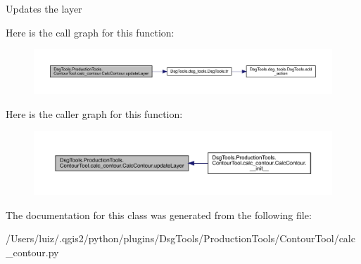 \begin{DoxyVerb}Updates the layer
\end{DoxyVerb}
 Here is the call graph for this function\+:
\nopagebreak
\begin{figure}[H]
\begin{center}
\leavevmode
\includegraphics[width=350pt]{class_dsg_tools_1_1_production_tools_1_1_contour_tool_1_1calc__contour_1_1_calc_contour_a909c2b0fc4a807a06532ddfbc44c8199_cgraph}
\end{center}
\end{figure}
Here is the caller graph for this function\+:
\nopagebreak
\begin{figure}[H]
\begin{center}
\leavevmode
\includegraphics[width=350pt]{class_dsg_tools_1_1_production_tools_1_1_contour_tool_1_1calc__contour_1_1_calc_contour_a909c2b0fc4a807a06532ddfbc44c8199_icgraph}
\end{center}
\end{figure}


The documentation for this class was generated from the following file\+:\begin{DoxyCompactItemize}
\item 
/\+Users/luiz/.\+qgis2/python/plugins/\+Dsg\+Tools/\+Production\+Tools/\+Contour\+Tool/calc\+\_\+contour.\+py\end{DoxyCompactItemize}
